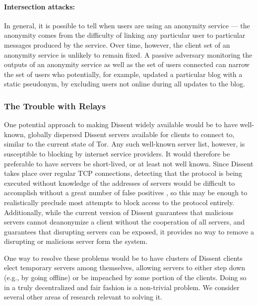     \paragraph{Intersection attacks:} In general,
    it is possible to tell when users are using an anonymity service --- the
    anonymity comes from the difficulty of linking any particular user to
    particular messages produced by the service. Over time, however, the client
    set of an anonymity service is unlikely to remain fixed. A passive
    adversary monitoring the outputs of an anonymity service as well as
    the set of users connected can narrow the set of users who
    potentially, for example, updated a particular blog with a static
    pseudonym, by excluding users  not online during all updates to the
    blog.

  \subsubsection{The Trouble with Relays}
  \label{Subsection:Relays}
    One potential approach to making Dissent widely available would be to have
    well-known, globally dispersed Dissent servers available for clients to
    connect to, similar to the current state of Tor. Any such well-known server
    list, however, is susceptible to blocking by internet service providers. It
    would therefore be preferable to have servers be short-lived, or at least
    not well known. Since Dissent takes place over regular TCP connections,
    detecting that the protocol is being executed without knowledge of the
    addresses of servers would be difficult to accomplish without a great number
    of false positives \cite{houmansadr_parrot_2013}, so this may be enough to
    realistically preclude most attempts to block access to the protocol
    entirely.  Additionally, while the current version of Dissent guarantees
    that malicious servers cannot deanonymize a client without the cooperation
    of all servers, and guarantees that disrupting servers can be exposed, it
    provides no way to remove a disrupting or malicious server form the system.

    One way to resolve these problems would be to have clusters of Dissent
    clients elect temporary servers among themselves, allowing servers to either
    step down (e.g., by going offline) or be impeached by some portion of the
    clients.  Doing so in a truly decentralized and fair fashion is a
    non-trivial problem.  We consider several other areas of research relevant
    to solving it.

